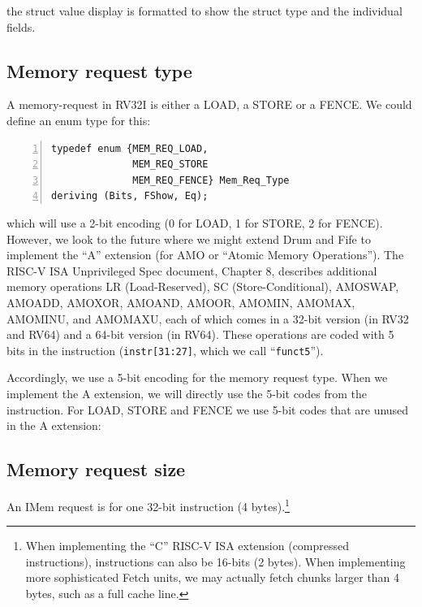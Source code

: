 {\ie} the struct value display is formatted to show the struct type
and the individual fields.


\subsection{Memory request type}

\label{Sec_Mem_Req_Type}

A memory-request in RV32I is either a LOAD, a STORE or a FENCE.  We
could define an enum type for this:

{\footnotesize
\begin{Verbatim}[frame=single, numbers=left]
typedef enum {MEM_REQ_LOAD,
              MEM_REQ_STORE
              MEM_REQ_FENCE} Mem_Req_Type
deriving (Bits, FShow, Eq);
\end{Verbatim}
}

which will use a 2-bit encoding (0 for LOAD, 1 for STORE, 2 for
FENCE).  However, we look to the future where we might extend Drum and
Fife to implement the ``A'' extension (for AMO or ``Atomic Memory
Operations'').  The RISC-V ISA Unprivileged Spec document, Chapter 8,
describes additional memory operations LR (Load-Reserved), SC
(Store-Conditional), AMOSWAP, AMOADD, AMOXOR, AMOAND, AMOOR, AMOMIN,
AMOMAX, AMOMINU, and AMOMAXU, each of which comes in a 32-bit version
(in RV32 and RV64) and a 64-bit version (in RV64).  These operations
are coded with 5 bits in the instruction (\verb|instr[31:27]|, which
we call ``{\tt funct5}'').

Accordingly, we use a 5-bit encoding for the memory request type.
When we implement the A extension, we will directly use the 5-bit
codes from the instruction.  For LOAD, STORE and FENCE we use 5-bit
codes that are unused in the A extension:



\subsection{Memory request size}

\label{Sec_Mem_Req_Size}

An IMem request is for one 32-bit instruction (4 bytes).\footnote{When
implementing the ``C'' RISC-V ISA extension (compressed instructions),
instructions can also be 16-bits (2 bytes).  When implementing more
sophisticated Fetch units, we may actually fetch chunks larger than 4
bytes, such as a full cache line.}

